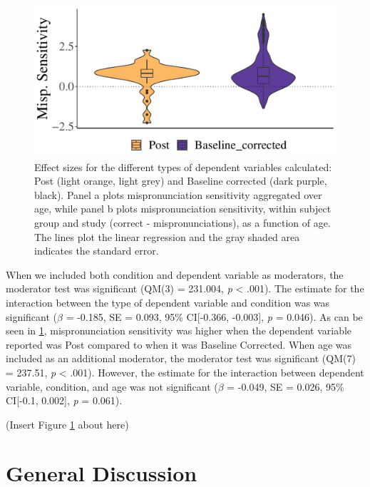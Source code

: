 \documentclass[
  english,
  man, noextraspace]{apa6}
\begin{document}
\begin{figure}
\centering
\includegraphics{VonHolzenBergmann_MPMetaAnalysis_files/figure-latex/PlotWithinCondDVbaseline-1.pdf}
\caption{\label{fig:PlotWithinCondDVbaseline}Effect sizes for the different types of dependent variables calculated: Post (light orange, light grey) and Baseline corrected (dark purple, black). Panel a plots mispronunciation sensitivity aggregated over age, while panel b plots mispronunciation sensitivity, within subject group and study (correct - mispronunciations), as a function of age. The lines plot the linear regression and the gray shaded area indicates the standard error.}
\end{figure}

When we included both condition and dependent variable as moderators, the moderator test was significant (QM(3) = 231.004, \emph{p} \textless{} .001). The estimate for the interaction between the type of dependent variable and condition was was significant (\(\beta\) = -0.185, SE = 0.093, 95\% CI{[}-0.366, -0.003{]}, \emph{p} = 0.046). As can be seen in \ref{fig:PlotWithinCondDVbaseline}, mispronunciation sensitivity was higher when the dependent variable reported was Post compared to when it was Baseline Corrected. When age was included as an additional moderator, the moderator test was significant (QM(7) = 237.51, \emph{p} \textless{} .001). However, the estimate for the interaction between dependent variable, condition, and age was not significant (\(\beta\) = -0.049, SE = 0.026, 95\% CI{[}-0.1, 0.002{]}, \emph{p} = 0.061).

(Insert Figure \ref{fig:PlotWithinCondDVbaseline} about here)

\hypertarget{general-discussion}{%
\section{General Discussion}\label{general-discussion}}
\end{document}
